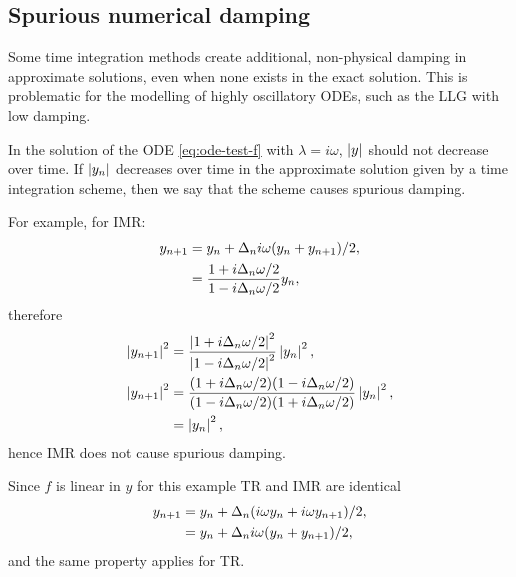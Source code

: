 \subsection{Spurious numerical damping}
\label{sec:numerical-damping}

Some time integration methods create additional, non-physical damping in approximate solutions, even when none exists in the exact solution.
This is problematic for the modelling of highly oscillatory ODEs, such as the LLG with low damping.

In the solution of the ODE \cref{eq:ode-test-f} with $\lambda = i\omega$, $\left|{y} \right|$ should not decrease over time.
If $\left|{y_n} \right|$ decreases over time in the approximate solution given by a time integration scheme, then we say that the scheme causes spurious damping.

For example, for IMR:
\begin{equation}
  \begin{aligned}
    y_{n+1} &= y_n + \Delta_{n} i \omega (y_n + y_{n+1})/2, \\
    &= \frac{1 + i\Delta_{n} \omega/2}{1 - i\Delta_{n} \omega/2} y_n,
  \end{aligned}
\end{equation}
therefore
\begin{equation}
  \begin{aligned}
    \left|{y_{n+1}} \right|^2 &=  \frac{\left|{1 + i\Delta_{n} \omega/2} \right|^2}{\left|{1 - i\Delta_{n} \omega/2} \right|^2} \left|{y_n} \right|^2, \\
    \left|{y_{n+1}} \right|^2 &=  \frac{(1 + i\Delta_{n} \omega/2)(1 - i\Delta_{n} \omega/2)}
    {(1 - i\Delta_{n} \omega/2)(1 + i\Delta_{n} \omega/2)} \left|{y_n} \right|^2, \\
    &=  \left|{y_n} \right|^2,
  \end{aligned}
\end{equation}
hence IMR does not cause spurious damping.

Since $f$ is linear in $y$ for this example TR and IMR are identical
\begin{equation}
  \begin{aligned}
    y_{n+1} &= y_n + \Delta_{n}(i\omega y_n + i\omega y_{n+1})/2, \\
    &= y_n + \Delta_{n} i \omega (y_n + y_{n+1})/2,
  \end{aligned}
\end{equation}
and the same property applies for TR.

